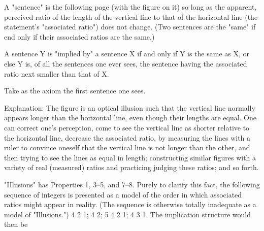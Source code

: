 \begin{sysrules}
A "sentence" is the following page (with the figure on it) so long as the 
apparent, perceived ratio of the length of the vertical line to that 
of the horizontal line (the statement's "associated ratio") does not 
change. (Two sentences are the "same" if end only if their 
associated ratios are the same.) 

A sentence Y is "implied by" a sentence X if and only if Y is the same as X, 
or else Y is, of all the sentences one ever sees, the sentence having 
the associated ratio next smaller than that of X. 

Take as the axiom the first sentence one sees. 

Explanation: The figure is an optical illusion such that the vertical line 
normally appears longer than the horizontal line, even though their 
lengths are equal. One can correct one's perception, come to see 
the vertical line as shorter relative to the horizontal line, decrease 
the associated ratio, by measuring the lines with a ruler to convince 
oneself that the vertical line is not longer than the other, and then 
trying to see the lines as equal in length; constructing similar 
figures with a variety of real (measured) ratios and practicing 
judging these ratios; and so forth. 
\end{sysrules}


"IIlusions" has Properties 1, 3--5, and 7--8. Purely to clarify this fact, the 
following sequence of integers is presented as a model of the order in which 
associated ratios might appear in reality. (The sequence is otherwise totally 
inadequate as a model of "Illusions.") 4 2 1; 4 2; 5 4 2 1; 4 3 1. The 
implication structure would then be 



